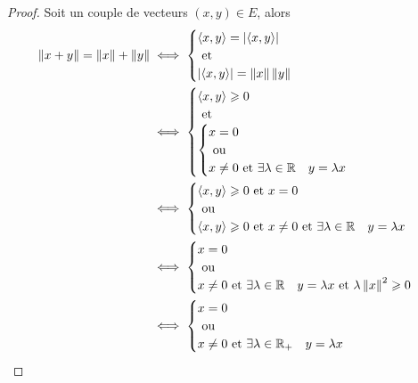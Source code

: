 \begin{proof}
  Soit un couple de  vecteurs \((x,y) \in E\), alors
  \begin{align}
    \left\lVert x+y\right\rVert = \left\lVert x\right\rVert+\left\lVert y\right\rVert &\iff \begin{cases} \left\langle{x},{y}\right\rangle = \left\lvert\left\langle{x},{y}\right\rangle\right\rvert \\ \text{~et~} \\ \left\lvert\left\langle{x},{y}\right\rangle\right\rvert = \left\lVert x\right\rVert\left\lVert y\right\rVert\end{cases} \\
    &\iff  \begin{cases}  \left\langle{x},{y}\right\rangle \geqslant 0 \\ \text{~et~} \\ \begin{cases} x=0 \\ \text{~ou~} \\ x\neq 0 \text{~et~} \exists \lambda \in \mathbb{R} \quad y=\lambda x\end{cases} \end{cases}\\
    & \iff \begin{cases} \left\langle{x},{y}\right\rangle \geqslant 0 \text{~et~} x =0 \\ \text{~ou~} \\  \left\langle{x},{y}\right\rangle \geqslant 0 \text{~et~} x \neq 0 \text{~et~} \exists \lambda \in \mathbb{R} \quad y=\lambda x \end{cases}\\
    & \iff \begin{cases} x=0 \\ \text{~ou~} \\ x \neq 0 \text{~et~} \exists \lambda \in \mathbb{R} \quad y=\lambda x \text{~et~} \lambda\left\lVert x\right\rVert^2 \geqslant 0 \end{cases} \\
      & \iff \begin{cases} x=0 \\ \text{~ou~} \\ x \neq 0 \text{~et~} \exists \lambda \in \mathbb{R}_{+} \quad y=\lambda x \end{cases}
  \end{align}
\end{proof}

